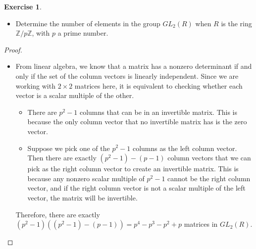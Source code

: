 \documentclass[12pt, psamsfonts]{amsart}
\theoremstyle{definition}
\newtheorem*{exer}{Exercise}
\theoremstyle{remark}
\numberwithin{equation}{section}
\begin{document}
\begin{exer}
  $ $
  \begin{itemize}
    \item
      Determine the number of elements in the group $GL_2(R)$ when $R$ is the ring $\mathbb{Z} / p\mathbb{Z}$, with $p$ a prime number.
  \end{itemize}
\end{exer}

\begin{proof}
  $ $
  \begin{itemize}
    \item
      From linear algebra, we know that a matrix has a nonzero determinant if and only if the set of the column vectors is linearly independent.
      Since we are working with $2 \times 2$ matrices here, it is equivalent to checking whether each vector is a scalar multiple of the other.
      \begin{itemize}
        \item
          There are $p^2 - 1$ columns that can be in an invertible matrix.
          This is because the only column vector that no invertible matrix has is the zero vector.
        \item
          Suppose we pick one of the $p^2 - 1$ columns as the left column vector.
          Then there are exactly $(p^2 - 1) - (p - 1)$ column vectors that we can pick as the right column vector to create an invertible matrix.
          This is because any nonzero scalar multiple of $p^2 - 1$ cannot be the right column vector, and if the right column vector is not a scalar multiple of the left vector, the matrix will be invertible.
      \end{itemize}
      Therefore, there are exactly $(p^2 - 1)((p^2 - 1) - (p - 1)) = p^4 - p^3 - p^2 + p$ matrices in $GL_2(R)$.
  \end{itemize}
\end{proof}
\end{document}
